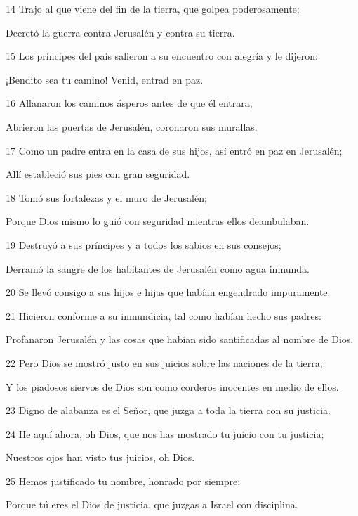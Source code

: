 \par 14 Trajo al que viene del fin de la tierra, que golpea poderosamente;
\par     Decretó la guerra contra Jerusalén y contra su tierra.
\par 15 Los príncipes del país salieron a su encuentro con alegría y le dijeron:
\par     ¡Bendito sea tu camino! Venid, entrad en paz.
\par 16 Allanaron los caminos ásperos antes de que él entrara;
\par     Abrieron las puertas de Jerusalén, coronaron sus murallas.
\par   
\par 17 Como un padre entra en la casa de sus hijos, así entró en paz en Jerusalén;
\par     Allí estableció sus pies con gran seguridad.
\par 18 Tomó sus fortalezas y el muro de Jerusalén;
\par     Porque Dios mismo lo guió con seguridad mientras ellos deambulaban.
\par 19 Destruyó a sus príncipes y a todos los sabios en sus consejos;
\par     Derramó la sangre de los habitantes de Jerusalén como agua inmunda.
\par 20 Se llevó consigo a sus hijos e hijas que habían engendrado impuramente.
\par   
\par 21 Hicieron conforme a su inmundicia, tal como habían hecho sus padres:
\par     Profanaron Jerusalén y las cosas que habían sido santificadas al nombre de Dios.
\par 22 Pero Dios se mostró justo en sus juicios sobre las naciones de la tierra;
\par     Y los piadosos siervos de Dios son como corderos inocentes en medio de ellos.
\par 23 Digno de alabanza es el Señor, que juzga a toda la tierra con su justicia.
\par   
\par 24 He aquí ahora, oh Dios, que nos has mostrado tu juicio con tu justicia;
\par     Nuestros ojos han visto tus juicios, oh Dios.
\par 25 Hemos justificado tu nombre, honrado por siempre;
\par     Porque tú eres el Dios de justicia, que juzgas a Israel con disciplina.
